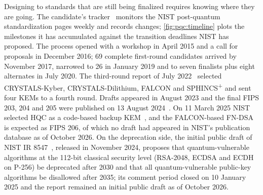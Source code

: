 Designing to standards that are still being finalized requires knowing where they are going. The candidate's tracker~\cite{guo2026nisttracker} monitors the NIST post-quantum standardization pages weekly and records changes; \cref{fig:pqc:timeline} plots the milestones it has accumulated against the transition deadlines NIST has proposed. The process opened with a workshop in April 2015 and a call for proposals in December 2016; 69 complete first-round candidates arrived by November 2017, narrowed to 26 in January 2019 and to seven finalists plus eight alternates in July 2020. The third-round report of July 2022~\cite{nist2022ir8413} selected CRYSTALS-Kyber, CRYSTALS-Dilithium, FALCON and SPHINCS\textsuperscript{+} and sent four KEMs to a fourth round. Drafts appeared in August 2023 and the final FIPS 203, 204 and 205 were published on 13 August 2024~\cite{nist2024fips203,nist2024fips204,nist2024fips205}. On 11 March 2025 NIST selected HQC as a code-based backup KEM~\cite{nist2025ir8545}, and the FALCON-based FN-DSA is expected as FIPS 206, of which no draft had appeared in NIST's publication database as of October 2026. On the deprecation side, the initial public draft of NIST IR 8547~\cite{nist2024ir8547}, released in November 2024, proposes that quantum-vulnerable algorithms at the 112-bit classical security level (RSA-2048, ECDSA and ECDH on P-256) be deprecated after 2030 and that all quantum-vulnerable public-key algorithms be disallowed after 2035; its comment period closed on 10 January 2025 and the report remained an initial public draft as of October 2026.

